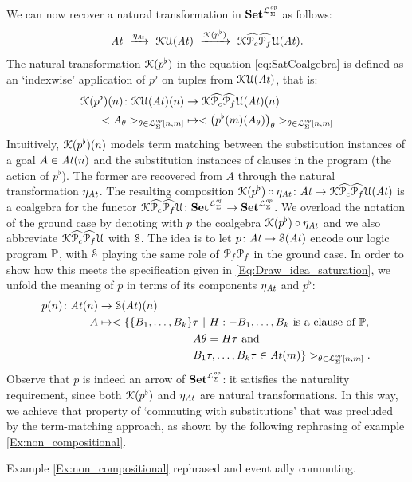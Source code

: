 We can now recover a natural transformation in $\mathbf{Set}^{\mathcal{L}^{\mathit{op}}_{\Sigma}}$ as follows:
\begin{eqnarray}\label{eq:SatCoalgebra}
  \mathit{At} \ \xrightarrow{\eta _{\mathit{At}}} \ \mathcal{K}\mathcal{U} (\mathit{At}) \ \xrightarrow{\mathcal{K}(p^{\flat})} \ \mathcal{K} \widehat{\mathcal P _c}\widehat{\mathcal P _f} \mathcal{U} (\mathit{At}) .
\end{eqnarray}
The natural transformation $\mathcal{K}(p^{\flat})$ in the equation \eqref{eq:SatCoalgebra} is defined as an `indexwise' application of $p^{\flat}$ on tuples from $\mathcal{K}\mathcal{U}(\mathit{At})$, that is:
\begin{align*}
    \mathcal{K}(p^{\flat})(n) \colon \mathcal{K}\mathcal{U}(\mathit{At})(n) & \to \mathcal{K}\widehat{\mathcal P _c}\widehat{\mathcal P _f} \mathcal{U} (\mathit{At})(n) \\
                     <A_{\theta}>_{\theta \in \mathcal{L}^{\mathit{op}}_{\Sigma}[n,m]}  & \mapsto <\big(p^{\flat}(m)(A_{\theta})\big)_{\theta}>_{\theta \in \mathcal{L}^{\mathit{op}}_{\Sigma}[n,m]}
\end{align*}
Intuitively, $\mathcal{K}(p^{\flat})(n)$ models term matching between the substitution instances of a goal $A \in \mathit{At}(n)$ and the substitution instances of clauses in the program (the action of $p^{\flat}$). The former are recovered from $A$ through the natural transformation $\eta_{\mathit{At}}$. The resulting composition $\mathcal{K}(p^{\flat})\circ \eta_{\mathit{At}}\colon \mathit{At} \to \mathcal{K} \widehat{\mathcal P _c}\widehat{\mathcal P _f}\mathcal{U} (\mathit{At})$ is a coalgebra for the functor $\mathcal{K} \widehat{\mathcal P _c}\widehat{\mathcal P _f}\mathcal{U} \colon \mathbf{Set}^{\mathcal{L}^{\mathit{op}}_{\Sigma}} \to \mathbf{Set}^{\mathcal{L}^{\mathit{op}}_{\Sigma}}$. We overload the notation of the ground case by denoting with $p$ the coalgebra $\mathcal{K}(p^{\flat})\circ \eta_{\mathit{At}}$ and we also abbreviate $\mathcal{K} \widehat{\mathcal P _c}\widehat{\mathcal P _f}\mathcal{U}$ with $\mathcal{S}$. The idea is to let $p \colon \mathit{At} \to \mathcal{S}(\mathit{At})$ encode our logic program $\mathbb{P}$, with $\mathcal{S}$ playing the same role of $\mathcal P_f\mathcal P_f$ in the ground case. In order to show how this meets the specification given in \eqref{Eq:Draw_idea_saturation}, we unfold the meaning of $p$ in terms of its components $\eta_{\mathit{At}}$ and $p^{\flat}$:
\begin{align}\label{Eq:Sat_p}
  p(n) \: \At (n)  &\to \FS (\At) (n)  \nonumber \\
            A      &\mapsto <\{ \{B_1,\dots,B_k\}\tau\ |\ H :- B_1,\dots,B_k \text{ is a clause of }\mb{P}\text{, } \nonumber \\
                   & \hspace{3cm} A \theta = H \tau \text{ and } \nonumber \\
                   & \hspace{3cm} B_1\tau, \dots, B_k\tau \in \At(m)\}>_{\theta \in \Lw[n,m]}.
\end{align}
Observe that $p$ is indeed an arrow of $\mathbf{Set}^{\mathcal{L}^{\mathit{op}}_{\Sigma}}$: it satisfies the naturality requirement, since both $\mathcal{K}(p^{\flat})$ and $\eta_{\mathit{At}}$ are natural transformations. In this way, we achieve that property of `commuting with substitutions' that was precluded by the term-matching approach, as shown by the following rephrasing of example \ref{Ex:non_compositional}.
\begin{example}\label{Ex:sat_is_compositional} Example \ref{Ex:non_compositional} rephrased and eventually commuting.
\end{example}


